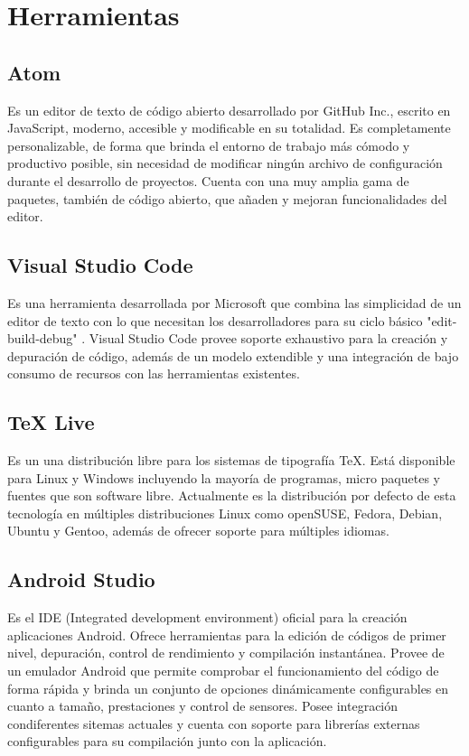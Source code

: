 \documentclass{article}
\begin{document}
\section{Herramientas} 
    \subsection{Atom}
        Es un editor de texto de código abierto desarrollado por GitHub Inc., escrito en JavaScript, moderno, accesible y modificable en su totalidad. Es completamente personalizable, de forma que brinda el entorno de trabajo más cómodo y productivo posible, sin necesidad de modificar ningún archivo de configuración durante el desarrollo de proyectos. Cuenta con una muy amplia gama de paquetes, también de código abierto, que añaden y mejoran funcionalidades del editor.

    \subsection{Visual Studio Code}
        Es una herramienta desarrollada por Microsoft que combina las simplicidad de un editor de texto con lo que necesitan los desarrolladores para su ciclo básico "edit-build-debug" . Visual Studio Code provee soporte exhaustivo para la creación y depuración de código, además de un modelo extendible y una integración de bajo consumo de recursos con las herramientas existentes.

    \subsection{TeX Live}
        Es un una distribución libre para los sistemas de tipografía TeX. Está disponible para Linux y Windows incluyendo la mayoría de programas, micro paquetes y fuentes que son software libre. Actualmente es la distribución por defecto de esta tecnología en múltiples distribuciones Linux como openSUSE, Fedora, Debian, Ubuntu y Gentoo, además de ofrecer soporte para múltiples idiomas.

    \subsection{Android Studio}
        Es el IDE (Integrated development environment) oficial para la creación aplicaciones Android. Ofrece herramientas para la edición de códigos de primer nivel, depuración, control de rendimiento y compilación instantánea. Provee de un emulador Android que permite comprobar el funcionamiento del código de forma rápida y brinda un conjunto de opciones dinámicamente configurables en cuanto a tamaño, prestaciones y control de sensores. Posee integración condiferentes sitemas actuales y cuenta con soporte para librerías externas configurables para su compilación junto con la aplicación.
\end{document}
